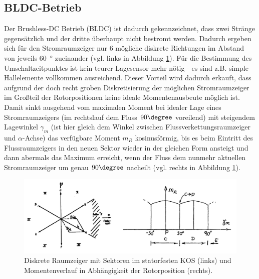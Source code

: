 \clearpage
\subsection{BLDC-Betrieb}
Der Brushless-DC Betrieb (BLDC) ist dadurch gekennzeichnet, dass zwei Stränge gegensätzlich und der dritte überhaupt nicht bestromt werden. Dadurch ergeben sich für den Stromraumzeiger nur 6 mögliche diskrete Richtungen im Abstand von jeweils \SI{60}{\degree} zueinander (vgl. links in Abbildung \ref{fig:bldc_schema}). Für die Bestimmung des Umschaltzeitpunktes ist kein teurer Lagesensor mehr nötig - es sind z.B. simple Hallelemente vollkommen ausreichend. Dieser Vorteil wird dadurch erkauft, dass aufgrund der doch recht groben Diskretisierung der möglichen Stromraumzeiger im Großteil der Rotorpositionen keine ideale Momentenausbeute möglich ist. Damit sinkt ausgehend vom maximalen Moment bei idealer Lage eines Stromraumzeigers (im rechtslauf dem Fluss $90\degree$ voreilend) mit steigendem Lagewinkel $\gamma_m$ (ist hier gleich dem Winkel zwischen Flussverkettungsraumzeiger und $\alpha$-Achse) das verfügbare Moment $m_R$ kosinusförmig, bis es beim Eintritt des Flussraumzeigers in den neuen Sektor wieder in der gleichen Form ansteigt und dann abermals das Maximum erreicht, wenn der Fluss dem nunmehr aktuellen Stromraumzeiger um genau $90\degree$ nacheilt (vgl. rechts in Abbildung \ref{fig:bldc_schema}).  

\begin{figure}[h!]
    \centering
    \includegraphics[scale=0.55]{2/BLDC.png}
    \caption{Diskrete Raumzeiger mit Sektoren im statorfesten KOS (links) und Momentenverlauf in Abhängigkeit der Rotorposition (rechts).}
    \label{fig:bldc_schema}
\end{figure}


